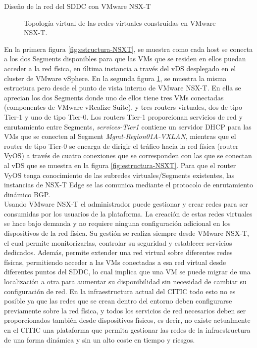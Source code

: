 \begin{subsubsection}{Diseño de la red del SDDC con VMware NSX-T}
\begin{figure}[h]
        \caption{Topología virtual de las redes virtuales construídas en VMware NSX-T.}
        \label{fig:two-tier-topology} 
    \end{figure}
    \FloatBarrier
    En la primera figura \ref{fig:estructura-NSXT}, se muestra como cada host se conecta a los dos Segments disponibles para que las VMs que se residen en ellos puedan acceder a la red física, en última instancia a través del vDS desplegado en el cluster de VMware vSphere. En la segunda figura \ref{fig:two-tier-topology}, se muestra la misma estructura pero desde el punto de vista interno de VMware NSX-T. En ella se aprecian los dos Segments donde uno de ellos tiene tres VMs conectadas (componentes de VMware vRealize Suite), y tres routers virtuales, dos de tipo Tier-1 y uno de tipo Tier-0. Los routers Tier-1 proporcionan servicios de red y enrutamiento entre Segments, \textit{services-Tier1} contiene un servidor DHCP  para las VMs que se conecten al Segment \textit{Mgmt-Region01A-VXLAN}, mientras que el router de tipo Tier-0 se encarga de dirigir el tráfico hacia la red física (router VyOS) a través de cuatro conexiones que se corresponden con las que se conectan al vDS que se muestra en la figura \ref{fig:estructura-NSXT}. Para que el router VyOS tenga conocimiento de las subredes virtuales/Segments existentes, las instancias de NSX-T Edge se las comunica mediante el protocolo de enrutamiento dinámico BGP.
    \\
    Usando VMware NSX-T el administrador puede gestionar y crear redes para ser consumidas por los usuarios de la plataforma. La creación de estas redes virtuales se hace bajo demanda y no requiere ninguna configuración adicional en los dispositivos de la red física. Su gestión se realiza siempre desde VMware NSX-T, el cual permite monitorizarlas, controlar su seguridad y establecer servicios dedicados. Además, permite extender una red virtual sobre diferentes redes físicas, permitiendo acceder a las VMs conectadas a esa red virtual desde diferentes puntos del SDDC, lo cual implica que una VM se puede migrar de una localización a otra para aumentar su disponibilidad sin necesidad de cambiar su configuración de red. En la infraestructura actual del CITIC todo esto no es posible ya que las redes que se crean dentro del entorno deben configurarse previamente sobre la red física, y todos los servicios de red necesarios deben ser proporcionados también desde dispositivos físicos, es decir, no existe actualmente en el CITIC una plataforma que permita gestionar las redes de la infraestructura de una forma dinámica y sin un alto coste en tiempo y riesgos.

\end{subsubsection}
